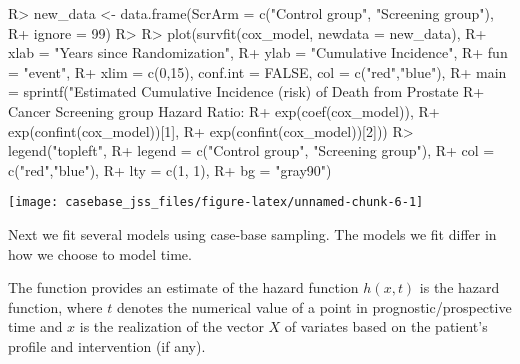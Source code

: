 \documentclass[article]{jss}
\begin{document}
\begin{CodeChunk}

\begin{CodeInput}
R> new_data <- data.frame(ScrArm = c("Control group", "Screening group"),
R+                        ignore = 99)
R> 
R> plot(survfit(cox_model, newdata = new_data),
R+      xlab = "Years since Randomization", 
R+      ylab = "Cumulative Incidence", 
R+      fun = "event",
R+      xlim = c(0,15), conf.int = FALSE, col = c("red","blue"), 
R+      main = sprintf("Estimated Cumulative Incidence (risk) of Death from Prostate 
R+                     Cancer Screening group Hazard Ratio: %
R+                     exp(coef(cox_model)), 
R+                     exp(confint(cox_model))[1], 
R+                     exp(confint(cox_model))[2]))
R> legend("topleft", 
R+        legend = c("Control group", "Screening group"), 
R+        col = c("red","blue"),
R+        lty = c(1, 1), 
R+        bg = "gray90")
\end{CodeInput}


\begin{center}\texttt{[image: casebase\_jss\_files/figure-latex/unnamed-chunk-6-1]} \end{center}

\end{CodeChunk}

Next we fit several models using case-base sampling. The models we fit
differ in how we choose to model time.

The  function provides an estimate of the hazard
function \(h(x, t)\) is the hazard function, where \(t\) denotes the
numerical value of a point in prognostic/prospective time and \(x\) is
the realization of the vector \(X\) of variates based on the patient's
profile and intervention (if any).
\end{document}
